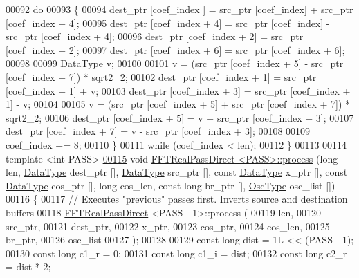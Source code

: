 \begin{DoxyCode}
00092     \textcolor{keywordflow}{do}
00093     \{
00094         dest\_ptr [coef\_index    ] = src\_ptr [coef\_index] + src\_ptr [coef\_index + 4];
00095         dest\_ptr [coef\_index + 4] = src\_ptr [coef\_index] - src\_ptr [coef\_index + 4];
00096         dest\_ptr [coef\_index + 2] = src\_ptr [coef\_index + 2];
00097         dest\_ptr [coef\_index + 6] = src\_ptr [coef\_index + 6];
00098 
00099         \hyperlink{a00013_a831663a8e0b1414e80f82cd3d18b5b6b}{DataType}            v;
00100 
00101         v = (src\_ptr [coef\_index + 5] - src\_ptr [coef\_index + 7]) * sqrt2\_2;
00102         dest\_ptr [coef\_index + 1] = src\_ptr [coef\_index + 1] + v;
00103         dest\_ptr [coef\_index + 3] = src\_ptr [coef\_index + 1] - v;
00104 
00105         v = (src\_ptr [coef\_index + 5] + src\_ptr [coef\_index + 7]) * sqrt2\_2;
00106         dest\_ptr [coef\_index + 5] = v + src\_ptr [coef\_index + 3];
00107         dest\_ptr [coef\_index + 7] = v - src\_ptr [coef\_index + 3];
00108 
00109         coef\_index += 8;
00110     \}
00111     \textcolor{keywordflow}{while} (coef\_index < len);
00112 \}
00113 
00114 \textcolor{keyword}{template} <\textcolor{keywordtype}{int} PASS>
\hypertarget{a00101_source_l00115}{}\hyperlink{a00013_a19e18210d065059938591fd5dfc31241}{00115} \textcolor{keywordtype}{void}    \hyperlink{a00013}{FFTRealPassDirect <PASS>::process} (\textcolor{keywordtype}{long} len, 
      \hyperlink{a00013_a831663a8e0b1414e80f82cd3d18b5b6b}{DataType} dest\_ptr [], \hyperlink{a00013_a831663a8e0b1414e80f82cd3d18b5b6b}{DataType} src\_ptr [], \textcolor{keyword}{const} \hyperlink{a00013_a831663a8e0b1414e80f82cd3d18b5b6b}{DataType} x\_ptr [], \textcolor{keyword}{const} 
      \hyperlink{a00013_a831663a8e0b1414e80f82cd3d18b5b6b}{DataType} cos\_ptr [], \textcolor{keywordtype}{long} cos\_len, \textcolor{keyword}{const} \textcolor{keywordtype}{long} br\_ptr [], \hyperlink{a00020}{OscType} osc\_list [])
00116 \{
00117     \textcolor{comment}{// Executes "previous" passes first. Inverts source and destination buffers}
00118     \hyperlink{a00013}{FFTRealPassDirect} <PASS - 1>::process (
00119         len,
00120         src\_ptr,
00121         dest\_ptr,
00122         x\_ptr,
00123         cos\_ptr,
00124         cos\_len,
00125         br\_ptr,
00126         osc\_list
00127     );
00128 
00129     \textcolor{keyword}{const} \textcolor{keywordtype}{long}      dist = 1L << (PASS - 1);
00130     \textcolor{keyword}{const} \textcolor{keywordtype}{long}      c1\_r = 0;
00131     \textcolor{keyword}{const} \textcolor{keywordtype}{long}      c1\_i = dist;
00132     \textcolor{keyword}{const} \textcolor{keywordtype}{long}      c2\_r = dist * 2;

\end{DoxyCode}
